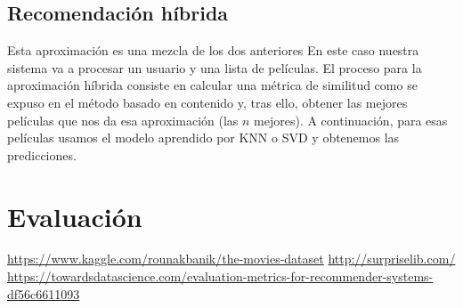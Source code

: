 		
		\subsection{Recomendación híbrida}				

			Esta aproximación es una mezcla de los dos anteriores En este caso nuestra sistema va a procesar un usuario y una lista de películas. El proceso para la aproximación híbrida consiste en calcular una métrica de similitud como se expuso en el método basado en contenido y, tras ello, obtener las mejores películas que nos da esa aproximación (las $n$ mejores). A continuación, para esas películas usamos el modelo aprendido por KNN o SVD y obtenemos las predicciones.

	\section{Evaluación}
	
		
	
\begin{thebibliography}{X}
	 \url{https://www.kaggle.com/rounakbanik/the-movies-dataset}
	 \url{http://surpriselib.com/}
	 \url{https://towardsdatascience.com/evaluation-metrics-for-recommender-systems-df56c6611093}
\end{thebibliography}



